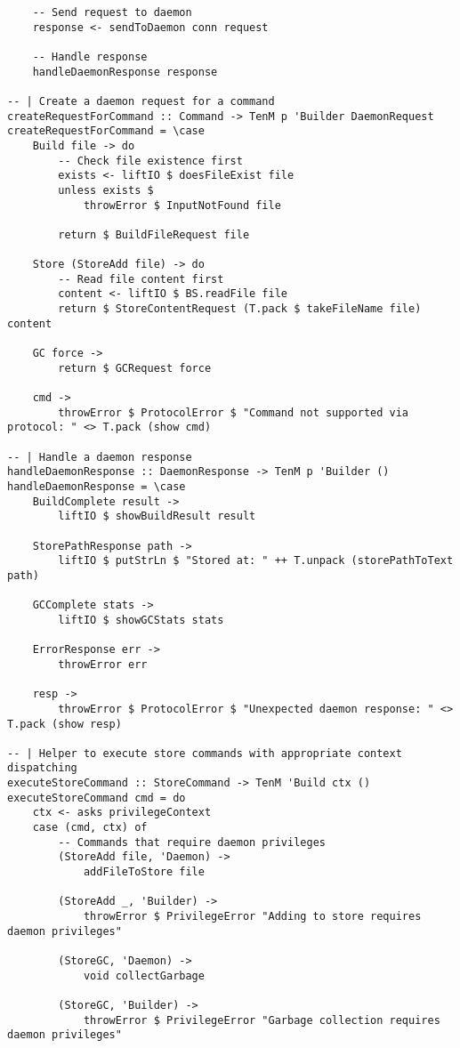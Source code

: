 \documentclass{article}
\begin{document}
\begin{tcolorbox}[title=Ten/CLI.hs Changes]
\begin{verbatim}
    -- Send request to daemon
    response <- sendToDaemon conn request

    -- Handle response
    handleDaemonResponse response

-- | Create a daemon request for a command
createRequestForCommand :: Command -> TenM p 'Builder DaemonRequest
createRequestForCommand = \case
    Build file -> do
        -- Check file existence first
        exists <- liftIO $ doesFileExist file
        unless exists $
            throwError $ InputNotFound file

        return $ BuildFileRequest file

    Store (StoreAdd file) -> do
        -- Read file content first
        content <- liftIO $ BS.readFile file
        return $ StoreContentRequest (T.pack $ takeFileName file) content

    GC force ->
        return $ GCRequest force

    cmd ->
        throwError $ ProtocolError $ "Command not supported via protocol: " <> T.pack (show cmd)

-- | Handle a daemon response
handleDaemonResponse :: DaemonResponse -> TenM p 'Builder ()
handleDaemonResponse = \case
    BuildComplete result ->
        liftIO $ showBuildResult result

    StorePathResponse path ->
        liftIO $ putStrLn $ "Stored at: " ++ T.unpack (storePathToText path)

    GCComplete stats ->
        liftIO $ showGCStats stats

    ErrorResponse err ->
        throwError err

    resp ->
        throwError $ ProtocolError $ "Unexpected daemon response: " <> T.pack (show resp)

-- | Helper to execute store commands with appropriate context dispatching
executeStoreCommand :: StoreCommand -> TenM 'Build ctx ()
executeStoreCommand cmd = do
    ctx <- asks privilegeContext
    case (cmd, ctx) of
        -- Commands that require daemon privileges
        (StoreAdd file, 'Daemon) ->
            addFileToStore file

        (StoreAdd _, 'Builder) ->
            throwError $ PrivilegeError "Adding to store requires daemon privileges"

        (StoreGC, 'Daemon) ->
            void collectGarbage

        (StoreGC, 'Builder) ->
            throwError $ PrivilegeError "Garbage collection requires daemon privileges"


\end{verbatim}
\end{tcolorbox}
\end{document}
